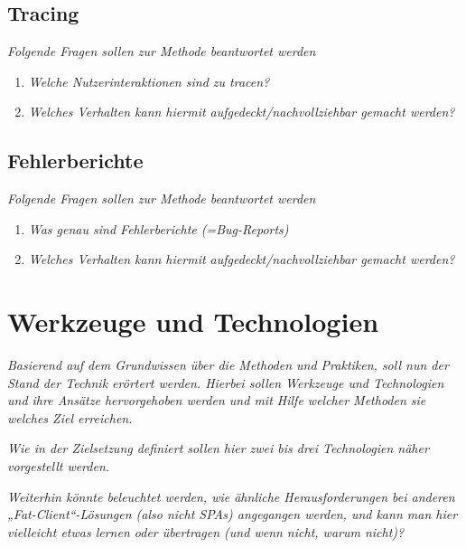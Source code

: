 \subsection{Tracing}

\textit{Folgende Fragen sollen zur Methode beantwortet werden}
\begin{enumerate}
	\item \textit{Welche Nutzerinteraktionen sind zu tracen?}
	\item \textit{Welches Verhalten kann hiermit aufgedeckt/nachvollziehbar gemacht werden?}
\end{enumerate}

\subsection{Fehlerberichte}

\textit{Folgende Fragen sollen zur Methode beantwortet werden}
\begin{enumerate}
	\item \textit{Was genau sind Fehlerberichte (=Bug-Reports) }
	\item \textit{Welches Verhalten kann hiermit aufgedeckt/nachvollziehbar gemacht werden?}
\end{enumerate}

\section{Werkzeuge und Technologien}

\textit{Basierend auf dem Grundwissen über die Methoden und Praktiken, soll nun der Stand der Technik erörtert werden. Hierbei sollen Werkzeuge und Technologien und ihre Ansätze hervorgehoben werden und mit Hilfe welcher Methoden sie welches Ziel erreichen.}

\textit{Wie in der Zielsetzung definiert sollen hier zwei bis drei Technologien näher vorgestellt werden.}

\textit{Weiterhin könnte beleuchtet werden, wie ähnliche Herausforderungen bei anderen „Fat-Client“-Lösungen (also nicht SPAs) angegangen werden, und kann man hier vielleicht etwas lernen oder übertragen (und wenn nicht, warum nicht)?}